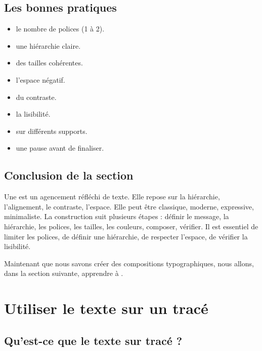 \subsection{Les bonnes pratiques}

\begin{itemize}
    \item {} le nombre de polices (1 à 2).
    \item {} une hiérarchie claire.
    \item {} des tailles cohérentes.
    \item {} l'espace négatif.
    \item {} du contraste.
    \item {} la lisibilité.
    \item {} sur différents supports.
    \item {} une pause avant de finaliser.
\end{itemize}

\subsection*{Conclusion de la section}

Une  est un agencement réfléchi de texte. Elle repose sur la hiérarchie, l'alignement, le contraste, l'espace. Elle peut être classique, moderne, expressive, minimaliste. La construction suit plusieurs étapes : définir le message, la hiérarchie, les polices, les tailles, les couleurs, composer, vérifier. Il est essentiel de limiter les polices, de définir une hiérarchie, de respecter l'espace, de vérifier la lisibilité.

Maintenant que nous savons créer des compositions typographiques, nous allons, dans la section suivante, apprendre à .

\section{Utiliser le texte sur un tracé}

\subsection{Qu'est-ce que le texte sur tracé ?}


